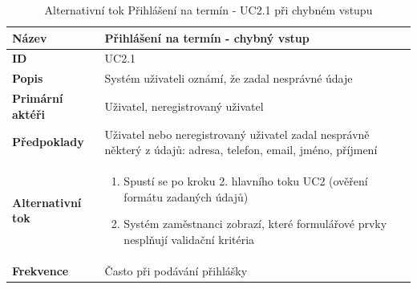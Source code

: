 \documentclass[12pt,a4paper,titlepage,final]{report}
\begin{document}
\begin{table}[!h]
	\begin{center}
    \begin{tabular}{ | p{4.5cm} | p{13cm} | }
    \hline
    \textbf{Název} & Přihlášení na termín - chybný vstup
    \\ \hline
    
	\textbf{ID} & UC2.1
	\\ \hline
	
	\textbf{Popis} & Systém uživateli oznámí, že zadal nesprávné údaje
	\\ \hline
	    
	\textbf{Primární aktéři} & Uživatel, neregistrovaný uživatel
	\\ \hline
	
	\textbf{Předpoklady} & Uživatel nebo neregistrovaný uživatel zadal nesprávně některý z údajů: adresa, telefon, email, jméno, příjmení
    \\ \hline
    
    \textbf{Alternativní tok} & 
    \vspace{-3.5mm}
    \begin{enumerate}
        \itemsep0em 
    	\item Spustí se po kroku 2. hlavního toku UC2 (ověření formátu zadaných údajů)
    	\item Systém zaměstnanci zobrazí, které formulářové prvky nesplňují validační kritéria
    \end{enumerate}
    \\ \hline              
    
	\textbf{Frekvence} & Často při podávání přihlášky
	\\ \hline
	\end{tabular}
		\caption{Alternativní tok Přihlášení na termín - UC2.1 při chybném vstupu}	
	\end{center}

\end{table}
\end{document}
